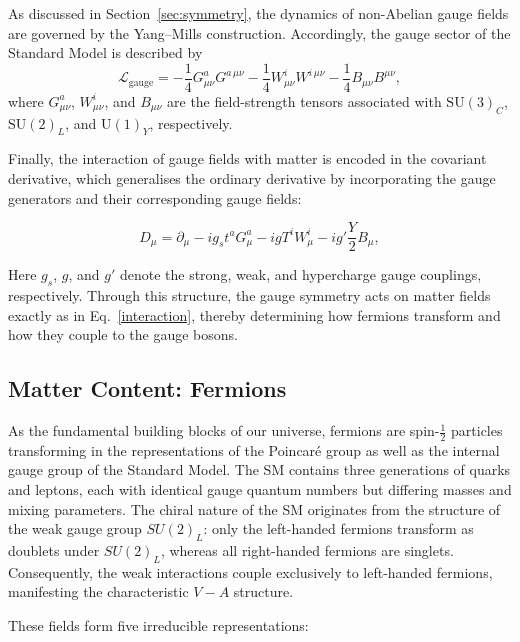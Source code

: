 As discussed in Section~\ref{sec:symmetry}, the dynamics of non-Abelian gauge fields are governed by the Yang--Mills construction.
Accordingly, the gauge sector of the Standard Model is described by
\begin{equation}
    \mathcal{L}_{\mathrm{gauge}}
    = -\frac{1}{4} G_{\mu\nu}^a G^{a\,\mu\nu}
      -\frac{1}{4} W_{\mu\nu}^i W^{i\,\mu\nu}
      -\frac{1}{4} B_{\mu\nu} B^{\mu\nu},
\end{equation}
\label{eq:SM-gauge}
where $G_{\mu\nu}^a$, $W_{\mu\nu}^i$, and $B_{\mu\nu}$ are the field-strength tensors associated with
$\mathrm{SU}(3)_C$, $\mathrm{SU}(2)_L$, and $\mathrm{U}(1)_Y$, respectively.

Finally, the interaction of gauge fields with matter is encoded in the covariant derivative, which generalises the ordinary derivative by incorporating the gauge generators and their corresponding gauge fields:

\begin{equation}
    D_\mu = \partial_\mu
    - i g_s t^a G_\mu^a
    - i g T^i W_\mu^i
    - i g' \frac{Y}{2} B_\mu,
\end{equation}\label{eq:gauge-fermion-interaction}

Here $g_s$, $g$, and $g'$ denote the strong, weak, and hypercharge gauge couplings, respectively. Through this structure, the gauge symmetry acts on matter fields exactly as in Eq.~\eqref{interaction}, thereby determining how fermions transform and how they couple to the gauge bosons.

\subsection{Matter Content: Fermions}\label{subsec:fermions}

As the fundamental building blocks of our universe, fermions are spin-$\tfrac{1}{2}$ particles transforming in the representations of the Poincaré group as well as the internal gauge group of the Standard Model.
The SM contains three generations of quarks and leptons, each with identical gauge quantum numbers but differing masses and mixing parameters.
The chiral nature of the SM originates from the structure of the weak gauge group $SU(2)_L$:
only the left-handed fermions transform as doublets under $SU(2)_L$, whereas all right-handed fermions are singlets.
Consequently, the weak interactions couple exclusively to left-handed fermions, manifesting the characteristic $V\!-\!A$ structure.

These fields form five irreducible representations:

